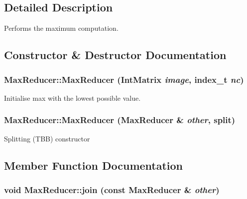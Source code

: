 \subsection{Detailed Description}
Performs the maximum computation. 

\subsection{Constructor \& Destructor Documentation}
\hypertarget{class_max_reducer_15429c52ea4767f8c4ed60530814a924}{
\subsubsection[{MaxReducer}]{\setlength{\rightskip}{0pt plus 5cm}MaxReducer::MaxReducer ({\bf IntMatrix} {\em image}, \/  {\bf index\_\-t} {\em nc})}}
\label{class_max_reducer_15429c52ea4767f8c4ed60530814a924}


Initialise max with the lowest possible value. \hypertarget{class_max_reducer_7c2c70197b7e05eb9ecacf0db0b8b3b4}{
\subsubsection[{MaxReducer}]{\setlength{\rightskip}{0pt plus 5cm}MaxReducer::MaxReducer ({\bf MaxReducer} \& {\em other}, \/  split)}}
\label{class_max_reducer_7c2c70197b7e05eb9ecacf0db0b8b3b4}


Splitting (TBB) constructor 

\subsection{Member Function Documentation}
\hypertarget{class_max_reducer_095078ad7a356586f27a79a97fc40ac9}{
\subsubsection[{join}]{\setlength{\rightskip}{0pt plus 5cm}void MaxReducer::join (const {\bf MaxReducer} \& {\em other})}}
\label{class_max_reducer_095078ad7a356586f27a79a97fc40ac9}


